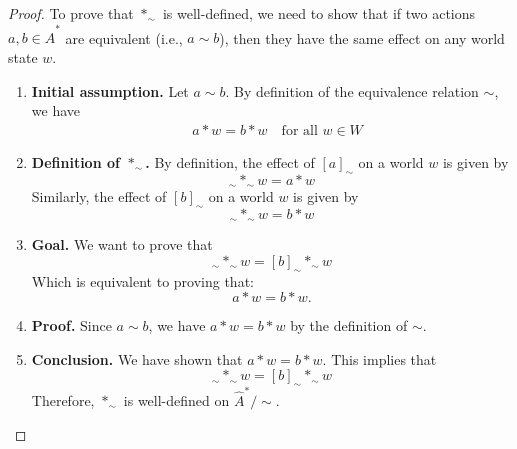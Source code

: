 \begin{proof}
	To prove that $\ast_{\sim}$ is well-defined, we need to show that if two actions $a, b \in \hat{A}^{\ast}$ are equivalent (i.e., $a \sim b$), then they have the same effect on any world state $w$.

	\begin{enumerate}[(1)]
		\item \textbf{Initial assumption.}
		      Let $a \sim b$.
		      By definition of the equivalence relation $\sim$, we have
		      \begin{align}
			       & a \ast w = b \ast w \quad \text{for all } w \in W
		      \end{align}

		\item \textbf{Definition of $\ast_{\sim}$.}
		      By definition, the effect of $[a]_{\sim}$ on a world $w$ is given by
		      \begin{equation}
			      [a]_{\sim} \ast_{\sim} w = a \ast w
		      \end{equation}
		      Similarly, the effect of $[b]_{\sim}$ on a world $w$ is given by
		      \begin{equation}
			      [b]_{\sim} \ast_{\sim} w = b \ast w
		      \end{equation}

		\item \textbf{Goal.}
		      We want to prove that
		      \begin{equation}
			      [a]_{\sim} \ast_{\sim} w = [b]_{\sim} \ast_{\sim} w
		      \end{equation}
		      Which is equivalent to proving that:
		      \begin{equation}
			      a \ast w = b \ast w.
		      \end{equation}

		\item \textbf{Proof.}
		      Since $a \sim b$, we have $a \ast w = b \ast w$ by the definition of $\sim$.

		\item \textbf{Conclusion.}
		      We have shown that $a \ast w = b \ast w$.
		      This implies that
		      \begin{equation}
			      [a]_{\sim} \ast_{\sim} w = [b]_{\sim} \ast_{\sim} w
		      \end{equation}
		      Therefore, $\ast_{\sim}$ is well-defined on $\hat{A}^{\ast}/\sim$.
	\end{enumerate}
\end{proof}

